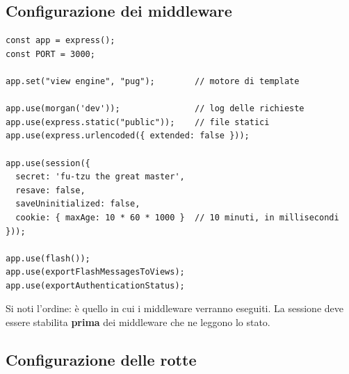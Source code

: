 \subsection{Configurazione dei middleware}

\begin{affianco}[0.6][c]
\codicepiccolo
\begin{lstlisting}[style=js, name=index.js]
const app = express();
const PORT = 3000;

app.set("view engine", "pug");        // motore di template

app.use(morgan('dev'));               // log delle richieste
app.use(express.static("public"));    // file statici
app.use(express.urlencoded({ extended: false }));

app.use(session({
  secret: 'fu-tzu the great master',
  resave: false,
  saveUninitialized: false,
  cookie: { maxAge: 10 * 60 * 1000 }  // 10 minuti, in millisecondi
}));

app.use(flash());
app.use(exportFlashMessagesToViews);
app.use(exportAuthenticationStatus);
\end{lstlisting}
\risultato
\begin{immagine}
\end{immagine}
\end{affianco}

Si noti l'ordine: è quello in cui i middleware verranno eseguiti. La sessione
deve essere stabilita \textbf{prima} dei middleware che ne leggono lo stato.

\subsection{Configurazione delle rotte}

